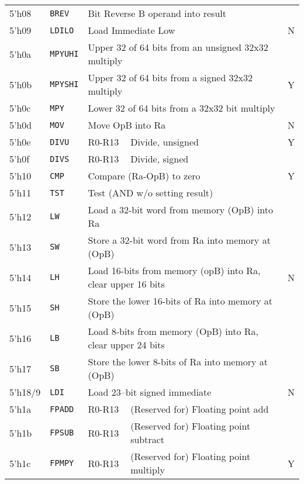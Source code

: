 \documentclass{gqtekspec}
\begin{document}
\begin{table}
\begin{center}
\begin{tabular}{|l|l|l|l|c|}
5'h08 & {\tt BREV} & \multicolumn{2}{l|}{Bit Reverse B operand into result}&  \\\cline{1-4}
5'h09 & {\tt LDILO} & \multicolumn{2}{l|}{Load Immediate Low} & N\\\hline
5'h0a & {\tt MPYUHI} & \multicolumn{2}{l|}{Upper 32 of 64 bits from an unsigned 32x32 multiply} &  \\\cline{1-4}
5'h0b & {\tt MPYSHI} & \multicolumn{2}{l|}{Upper 32 of 64 bits from a signed 32x32 multiply} & Y \\\cline{1-4}
5'h0c & {\tt MPY} & \multicolumn{2}{l|}{Lower 32 of 64 bits from a 32x32 bit multiply} & \\\hline
5'h0d & {\tt MOV} & \multicolumn{2}{l|}{Move OpB into Ra} & N \\\hline
5'h0e & {\tt DIVU} & R0-R13 & Divide, unsigned & Y \\\cline{1-4}
5'h0f & {\tt DIVS} & R0-R13 & Divide, signed &  \\\hline\hline
%
5'h10 & {\tt CMP} & \multicolumn{2}{l|}{Compare (Ra-OpB) to zero} & Y \\\cline{1-4}
5'h11 & {\tt TST} & \multicolumn{2}{l|}{Test (AND w/o setting result)} &   \\\hline
5'h12 & {\tt LW} & \multicolumn{2}{l|}{Load a 32-bit word from memory (OpB) into Ra} & \\\cline{1-4}
5'h13 & {\tt SW} & \multicolumn{2}{l|}{Store a 32-bit word from Ra into memory at (OpB)} &  \\\cline{1-4}
5'h14 & {\tt LH} & \multicolumn{2}{l|}{Load 16-bits from memory (opB) into Ra, clear upper 16 bits} & N \\\cline{1-4}
5'h15 & {\tt SH} & \multicolumn{2}{l|}{Store the lower 16-bits of Ra into memory at (OpB)} &  \\\cline{1-4}
5'h16 & {\tt LB} & \multicolumn{2}{l|}{Load 8-bits from memory (OpB) into Ra, clear upper 24 bits} & \\\cline{1-4}
5'h17 & {\tt SB} & \multicolumn{2}{l|}{Store the lower 8-bits of Ra into memory at (OpB)} &  \\\hline\hline
5'h18/9 & {\tt LDI} & \multicolumn{2}{l|}{Load 23--bit signed immediate} & N \\\hline\hline
5'h1a & {\tt FPADD} & R0-R13 & (Reserved for) Floating point add &  \\\cline{1-4}
5'h1b & {\tt FPSUB} & R0-R13 & (Reserved for) Floating point subtract &   \\\cline{1-4}
5'h1c & {\tt FPMPY} & R0-R13 & (Reserved for) Floating point multiply & Y \\\cline{1-4}

\end{tabular}
\end{center}
\end{table}
\end{document}
